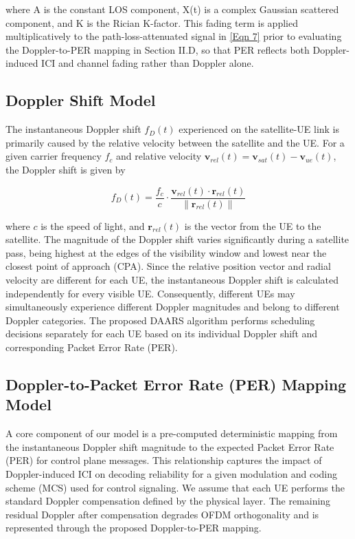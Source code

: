 \documentclass[conference]{IEEEtran}
\begin{document}
where A is the constant LOS component, X(t) is a complex Gaussian scattered component, and K is the Rician K-factor. This fading term is applied multiplicatively to the path-loss-attenuated signal in \ref{Eqn 7} prior to evaluating the Doppler-to-PER mapping in Section II.D, so that PER reflects both Doppler-induced ICI and channel fading rather than Doppler alone.

\subsection{Doppler Shift Model}
The instantaneous Doppler shift $f_D(t)$ experienced on the satellite-UE link is primarily caused by the relative velocity between the satellite and the UE. For a given carrier frequency $f_c$ and relative velocity $\mathbf{v}_{rel}(t) = \mathbf{v}_{sat}(t) - \mathbf{v}_{ue}(t)$, the Doppler shift is given by

\begin{equation}
    \label{Eqn 9}
f_D(t) = \frac{f_c}{c} \cdot \frac{\mathbf{v}_{rel}(t) \cdot \mathbf{r}_{rel}(t)}{\|\mathbf{r}_{rel}(t)\|}
\end{equation}

where $c$ is the speed of light, and $\mathbf{r}_{rel}(t)$ is the vector from the UE to the satellite. The magnitude of the Doppler shift varies significantly during a satellite pass, being highest at the edges of the visibility window and lowest near the closest point of approach (CPA). Since the relative position vector and radial velocity are different for each UE, the instantaneous Doppler shift is calculated independently for every visible UE. Consequently, different UEs may simultaneously experience different Doppler magnitudes and belong to different Doppler categories. The proposed DAARS algorithm performs scheduling decisions separately for each UE based on its individual Doppler shift and corresponding Packet Error Rate (PER).

\subsection{Doppler-to-Packet Error Rate (PER) Mapping Model}
\label{sec:doppler_per_mapping}
A core component of our model is a pre-computed deterministic mapping from the instantaneous Doppler shift magnitude to the expected Packet Error Rate (PER) for control plane messages. This relationship captures the impact of Doppler-induced ICI on decoding reliability for a given modulation and coding scheme (MCS) used for control signaling. We assume that each UE performs the standard Doppler compensation defined by the physical layer. The remaining residual Doppler after compensation degrades OFDM orthogonality and is represented through the proposed Doppler-to-PER mapping.
\end{document}
